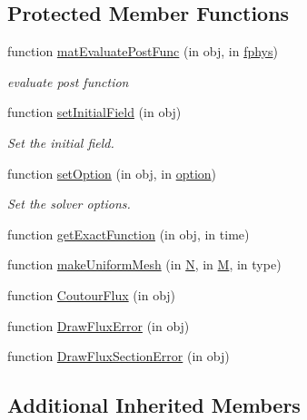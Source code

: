 \subsection*{Protected Member Functions}
\begin{DoxyCompactItemize}
\item 
function \hyperlink{class_steady_mount2d_a31a4c892298d775d35587b5ea7441189}{mat\+Evaluate\+Post\+Func} (in obj, in \hyperlink{class_ndg_phys_a6b25724fc9474d32018439009072f0a9}{fphys})
\begin{DoxyCompactList}\small\item\em evaluate post function \end{DoxyCompactList}\item 
function \hyperlink{class_steady_mount2d_a4ca607b4dc0cad24a61f386eb01eea0f}{set\+Initial\+Field} (in obj)
\begin{DoxyCompactList}\small\item\em Set the initial field. \end{DoxyCompactList}\item 
function \hyperlink{class_steady_mount2d_a9abff349f11a8a4cdb84a92992ae3b04}{set\+Option} (in obj, in \hyperlink{class_ndg_phys_af91f4c54b93504e76b38a5693774dff1}{option})
\begin{DoxyCompactList}\small\item\em Set the solver options. \end{DoxyCompactList}\item 
function \hyperlink{class_steady_mount2d_a8e7fe38949a59a35b442117b8b8fb93e}{get\+Exact\+Function} (in obj, in time)
\item 
function \hyperlink{class_steady_mount2d_ae995ff3d8a1b9bb9fd6e6e48910cc566}{make\+Uniform\+Mesh} (in \hyperlink{class_steady_mount2d_ac3443a8e75ae838f0212f2d648c168c4}{N}, in \hyperlink{class_steady_mount2d_a673d2d7065f2593ca3b74820c6ced410}{M}, in type)
\item 
function \hyperlink{class_steady_mount2d_a2a8c5dcdd00a9d216e5bbca60d5d8092}{Coutour\+Flux} (in obj)
\item 
function \hyperlink{class_steady_mount2d_a1b538613a6276f35a649e8b8dddeb513}{Draw\+Flux\+Error} (in obj)
\item 
function \hyperlink{class_steady_mount2d_a877475fe4bc81d51c1e77e73b64b7904}{Draw\+Flux\+Section\+Error} (in obj)
\end{DoxyCompactItemize}
\subsection*{Additional Inherited Members}


